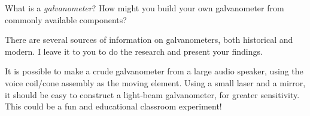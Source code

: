 

What is a {\it galvanometer}?  How might you build your own galvanometer from commonly available components?







There are several sources of information on galvanometers, both historical and modern.  I leave it to you to do the research and present your findings.







It is possible to make a crude galvanometer from a large audio speaker, using the voice coil/cone assembly as the moving element.  Using a small laser and a mirror, it should be easy to construct a light-beam galvanometer, for greater sensitivity.  This could be a fun and educational classroom experiment!




